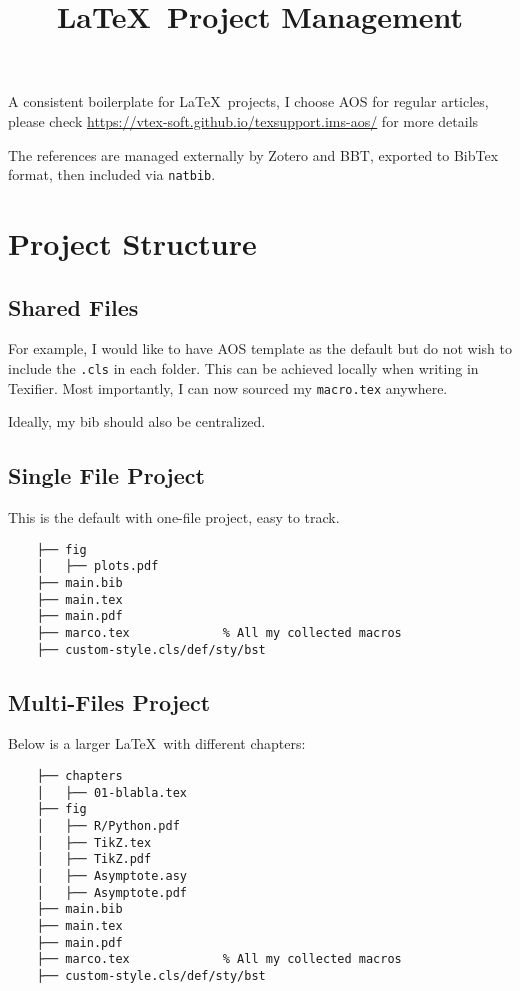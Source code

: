 \documentclass[aos,preprint]{imsart}
\begin{document}
\title{\LaTeX\ Project Management}

A consistent boilerplate for \LaTeX\ projects,
I choose AOS for regular articles, please check 
\url{https://vtex-soft.github.io/texsupport.ims-aos/} for more details

The references are managed externally by Zotero and BBT,
exported to BibTex format, then included via \verb|natbib|.

\section{Project Structure}

\subsection{Shared Files}

For example, I would like to have AOS template as the default but do not wish
to include the \texttt{.cls} in each folder.
This can be achieved locally when writing in Texifier.
Most importantly, I can now sourced my \texttt{macro.tex} anywhere.

Ideally, my bib should also be centralized.


\subsection{Single File Project}

This is the default with one-file project, easy to track.

\begin{Verbatim}
    ├── fig
    │   ├── plots.pdf
    ├── main.bib
    ├── main.tex
    ├── main.pdf
    ├── marco.tex             % All my collected macros
    ├── custom-style.cls/def/sty/bst
\end{Verbatim}

\subsection{Multi-Files Project}

Below is a larger \LaTeX\ with different chapters:

\begin{Verbatim}
    ├── chapters
    │   ├── 01-blabla.tex
    ├── fig
    │   ├── R/Python.pdf
    │   ├── TikZ.tex
    │   ├── TikZ.pdf
    │   ├── Asymptote.asy
    │   ├── Asymptote.pdf
    ├── main.bib
    ├── main.tex
    ├── main.pdf
    ├── marco.tex             % All my collected macros
    ├── custom-style.cls/def/sty/bst
\end{Verbatim}
\end{document}
